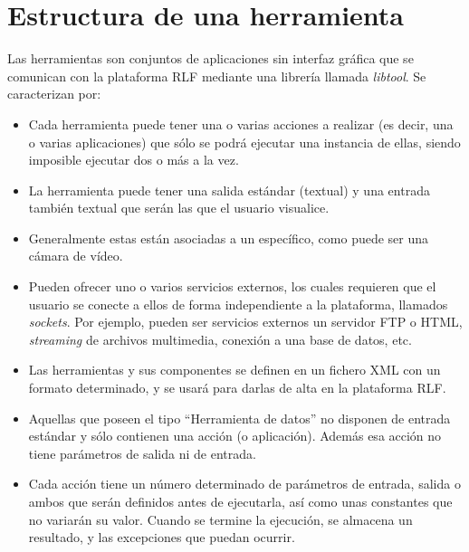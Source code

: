 

\section*{Estructura de una herramienta}
Las herramientas son conjuntos de aplicaciones sin interfaz gráfica que se 
comunican con la plataforma RLF mediante una librería llamada 
\emph{libtool}. Se caracterizan por:

\begin{itemize}
\item Cada herramienta puede tener una o varias acciones a realizar 
(es decir, una o varias aplicaciones) que sólo se podrá ejecutar una 
instancia de ellas, siendo imposible ejecutar dos o más a la vez.
\item La herramienta puede tener una salida estándar (textual) y una 
entrada también textual que serán las que el usuario visualice.
\item Generalmente estas están asociadas a un \hardware específico, 
como puede ser una cámara de vídeo.
\item Pueden ofrecer uno o varios servicios externos, los cuales 
requieren que el usuario se conecte a ellos de forma independiente a 
la plataforma, llamados \emph{sockets}. Por ejemplo, pueden ser 
servicios externos un servidor FTP o HTML, \emph{streaming} de 
archivos multimedia, conexión a una base de datos, etc.
\item Las herramientas y sus componentes se definen en un fichero XML 
con un formato determinado, y se usará para darlas de alta en la 
plataforma RLF.
\item Aquellas que poseen el tipo ``Herramienta de datos'' no disponen 
de entrada estándar y sólo contienen una acción (o aplicación). 
Además esa acción no tiene parámetros de salida ni de entrada.
\item Cada acción tiene un número determinado de parámetros de 
entrada, salida o ambos que serán definidos antes de ejecutarla, así 
como unas constantes que no variarán su valor. 
Cuando se termine la ejecución, se almacena un resultado, y las 
excepciones que puedan ocurrir.
\end{itemize}

